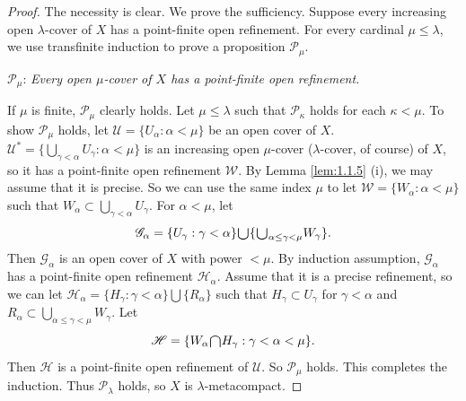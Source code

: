 \documentclass[main.tex]{subfiles}
\begin{document}
\begin{proof} The necessity is clear. We prove the sufficiency.
Suppose every increasing open $\lambda$-cover of $X$ has a point-finite 
open refinement. 
For every cardinal $\mu \le \lambda$,
we use transfinite induction to prove a proposition  $\mathcal{P}_\mu$.

$\mathcal{P}_\mu$: \textit{Every open $\mu$-cover of $X$ has a point-finite open refinement.}
 
\noindent If $\mu$ is finite, $\mathcal{P}_\mu$ clearly holds.
Let $\mu \le \lambda$ such that $\mathcal{P}_\kappa$ holds for each $\kappa < \mu$. 
To show $\mathcal{P}_\mu$ holds, let $\mathscr{U} = \{U_\alpha: \alpha < \mu\}$ 
be an open cover of $X$.
$\mathscr{U}^* = \{ \bigcup_{\gamma < \alpha} U_\gamma: \alpha < \mu \}$ is 
an increasing open $\mu$-cover ($\lambda$-cover, of course) of $X$, so it has a point-finite open 
refinement $\mathscr{W}$. By Lemma \ref{lem:1.1.5} (i), we may assume that it is
precise. So we can use the same index $\mu$ to 
let $\mathscr{W} = \{W_\alpha: \alpha < \mu\}$ such that 
$W_\alpha \subset \bigcup_{\gamma < \alpha} U_\gamma$. 
For $\alpha < \mu$, let
$$\mathscr{G}_\alpha = \{ U_\gamma: \gamma < \alpha \} \raisebox{-2pt}{\scalebox{1.5}{$\cup$}} \{ \raisebox{-2pt}{\scalebox{1.5}{$\cup$}}_{\alpha\le\gamma < \mu} W_\gamma \}.$$
Then $\mathscr{G}_\alpha$ is an open cover of $X$ with power $< \mu$. 
By induction assumption, $\mathscr{G}_\alpha$ has a point-finite open 
refinement $\mathscr{H}_\alpha$. Assume that it is a  precise refinement,
so we can let 
$\mathscr{H}_\alpha = \{ H_\gamma: \gamma < \alpha \} \bigcup \{ R_\alpha \}$ 
such that $H_\gamma \subset U_\gamma$ for $\gamma < \alpha$ 
and $R_\alpha \subset \bigcup_{\alpha\le\gamma < \mu} W_\gamma$.
Let
$$\mathscr{H} = \{W_\alpha\raisebox{-2pt}{\scalebox{1.5}{$\cap$}} 
H_\gamma: \gamma <\alpha<\mu\}.$$
Then $\mathscr{H}$ is a point-finite open refinement of $\mathscr{U}$. So $\mathcal{P}_\mu$ holds.
This completes the induction. Thus $\mathcal{P}_\lambda$ holds, 
so $X$ is $\lambda$-metacompact. \end{proof}




\end{document}
